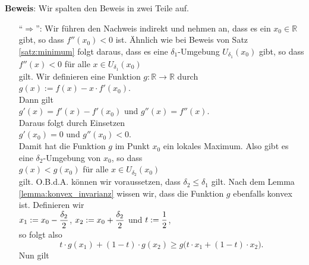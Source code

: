 \noindent
\textbf{Beweis}: Wir spalten den Beweis in zwei Teile auf.
\begin{enumerate}
\item[``$\Rightarrow$'':] Wir f\"uhren den Nachweis indirekt und nehmen an, dass es ein $x_0 \in \mathbb{R}$
  gibt, so dass $f''(x_0) < 0$ ist.  \"Ahnlich wie bei Beweis von Satz \ref{satz:minimum} folgt daraus, dass
  es eine $\delta_1$-Umgebung $U_{\delta_1}(x_0)$ gibt, so dass
  \\[0.2cm]
  \hspace*{1.3cm} $f''(x) < 0$ \quad f\"ur alle $x \in U_{\delta_1}(x_0)$ 
  \\[0.2cm]
  gilt.  Wir definieren eine Funktion $g:\mathbb{R} \rightarrow \mathbb{R}$ durch
  \\[0.2cm]
  \hspace*{1.3cm}
  $g(x) := f(x) - x \cdot f'(x_0)$.
  \\[0.2cm]
  Dann gilt 
  \\[0.2cm]
  \hspace*{1.3cm}
  $g'(x) = f'(x) - f'(x_0)$ \quad und \quad $g''(x) = f''(x)$.
  \\[0.2cm]
  Daraus folgt durch Einsetzen
  \\[0.2cm]
  \hspace*{1.3cm}
  $g'(x_0) = 0$ \quad und \quad $g''(x_0) < 0$.
  \\[0.2cm]
  Damit hat die Funktion $g$ im Punkt $x_0$ ein lokales Maximum.  Also gibt es eine $\delta_2$-Umgebung von
  $x_0$, so dass
  \\[0.2cm]
  \hspace*{1.3cm}
  $g(x) < g(x_0)$ \quad f\"ur alle $x \in U_{\delta_2}(x_0)$
  \\[0.2cm]
  gilt.  O.B.d.A. k\"onnen wir voraussetzen, dass $\delta_2 \leq \delta_1$ gilt.  
  Nach dem Lemma \ref{lemma:konvex_invarianz} wissen wir, dass die Funktion $g$ ebenfalls konvex ist.
  Definieren wir
\\[0.2cm]
\hspace*{1.3cm}
 $\displaystyle x_1 := x_0 - \frac{\delta_2}{2}$, \quad $\displaystyle x_2 := x_0 + \frac{\delta_2}{2}$ \quad und \quad $\displaystyle t := \frac{1}{2}$,
\\[0.2cm]
  so folgt also
  \begin{equation}
    \label{eq:konvex1}
  t \cdot g(x_1) + (1 - t) \cdot g(x_2) \geq g\bigl(t \cdot x_1 + (1-t) \cdot x_2\bigr).
  \end{equation}
  Nun gilt 
  \\[-0.2cm]
  \hspace*{1.3cm}

\end{enumerate}
